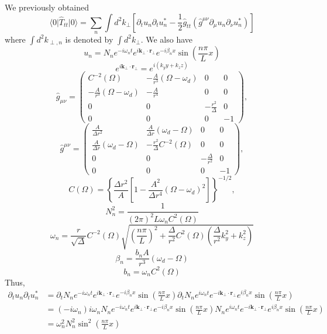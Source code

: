 \documentclass[english]{article}
\begin{document}
We previously obtained 
\[
\langle0\vert\hat{T}_{tt}\vert0\rangle=\sum_{n}\int d^{2}k_{\perp}\left[\partial_{t}u_{n}\partial_{t}u^{*}_{n}-\frac{1}{2}\hat{g}_{tt}\left(\hat{g}^{\mu\nu}\partial_{\mu}u_{n}\partial_{\nu}u^{*}_{n}\right)\right]
\]
 where $\int d^{2}k_{\perp,n}$ is denoted by $\int d^{2}k_{\perp}$.
We also have 
\[
u_{n}=N_{n}e^{-i\omega_{n}t}e^{i\boldsymbol{k}_{\bot}\cdot\boldsymbol{r}_{\bot}}e^{-i\beta_{n}x}\sin\left(\frac{n\pi}{L}x\right)
\]
 {}
\[
e^{i\boldsymbol{k}_{\bot}\cdot\boldsymbol{r}_{\bot}}=e^{i\left(k_{y}y+k_{z}z\right)}
\]
 {}
\[
\hat{g}_{\mu\nu}=\begin{pmatrix}C^{-2}\left(\Omega\right) & -\frac{A}{r^{3}}\left(\Omega-\omega_{d}\right) & 0 & 0\\
-\frac{A}{r^{3}}\left(\Omega-\omega_{d}\right) & -\frac{A}{r^{4}} & 0 & 0\\
0 & 0 & -\frac{r^{2}}{\Delta} & 0\\
0 & 0 & 0 & -1
\end{pmatrix},
\]
 {}
\[
\hat{g}^{\mu\nu}=\begin{pmatrix}\frac{A}{\Delta r^{2}} & \frac{A}{\Delta r}\left(\omega_{d}-\Omega\right) & 0 & 0\\
\frac{A}{\Delta r}\left(\omega_{d}-\Omega\right) & -\frac{r^{2}}{\Delta}C^{-2}\left(\Omega\right) & 0 & 0\\
0 & 0 & -\frac{\Delta}{r^{2}} & 0\\
0 & 0 & 0 & -1
\end{pmatrix},
\]
 {}
\[
C\left(\Omega\right)=\left\{ \frac{\Delta r^{2}}{A}\left[1-\frac{A^{2}}{\Delta r^{4}}\left(\Omega-\omega_{d}\right)^{2}\right]\right\} ^{-1/2},
\]
 {}
\[
N^{2}_{n}=\frac{1}{\left(2\pi\right)^{2}L\omega_{n}C^{2}\left(\Omega\right)}
\]
 {}
\[
\omega_{n}=\frac{r}{\sqrt{\Delta}}C^{-2}\left(\Omega\right)\sqrt{\left(\frac{n\pi}{L}\right)^{2}+\frac{\Delta}{r^{2}}C^{2}\left(\Omega\right)\left(\frac{\Delta}{r^{2}}k^{2}_{y}+k^{2}_{z}\right)}
\]
 {}
\[
\beta_{n}=\frac{b_{n}A}{r^{3}}\left(\omega_{d}-\Omega\right)
\]
 {}
\[
b_{n}=\omega_{n}C^{2}\left(\Omega\right)
\]
 Thus, 
\begin{align*}
\partial_{t}u_{n}\partial_{t}u^{*}_{n} & =\partial_{t}N_{n}e^{-i\omega_{n}t}e^{i\boldsymbol{k}_{\bot}\cdot\boldsymbol{r}_{\bot}}e^{-i\beta_{n}x}\sin\left(\frac{n\pi}{L}x\right)\partial_{t}N_{n}e^{i\omega_{n}t}e^{-i\boldsymbol{k}_{\bot}\cdot\boldsymbol{r}_{\bot}}e^{i\beta_{n}x}\sin\left(\frac{n\pi}{L}x\right)\\
 & =\left(-i\omega_{n}\right)i\omega_{n}N_{n}e^{-i\omega_{n}t}e^{i\boldsymbol{k}_{\bot}\cdot\boldsymbol{r}_{\bot}}e^{-i\beta_{n}x}\sin\left(\frac{n\pi}{L}x\right)N_{n}e^{i\omega_{n}t}e^{-i\boldsymbol{k}_{\bot}\cdot\boldsymbol{r}_{\bot}}e^{i\beta_{n}x}\sin\left(\frac{n\pi}{L}x\right)\\
 & =\omega^{2}_{n}N^{2}_{n}\sin^{2}\left(\frac{n\pi}{L}x\right)
\end{align*}
\end{document}

